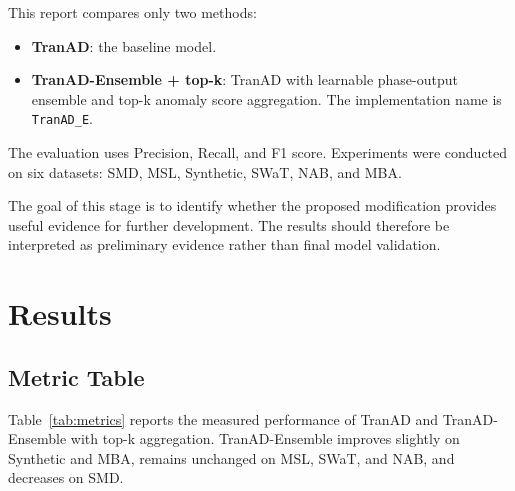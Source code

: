 \documentclass[a4paper,11pt]{article}
\begin{document}
This report compares only two methods:

\begin{itemize}
    \item \textbf{TranAD}: the baseline model.
    \item \textbf{TranAD-Ensemble + top-k}: TranAD with learnable phase-output ensemble and top-k anomaly score aggregation. The implementation name is \texttt{TranAD\_E}.
\end{itemize}

The evaluation uses Precision, Recall, and F1 score. Experiments were conducted on six datasets: SMD, MSL, Synthetic, SWaT, NAB, and MBA.

The goal of this stage is to identify whether the proposed modification provides useful evidence for further development. The results should therefore be interpreted as preliminary evidence rather than final model validation.

\section{Results}

\subsection{Metric Table}

Table~\ref{tab:metrics} reports the measured performance of TranAD and TranAD-Ensemble with top-k aggregation. TranAD-Ensemble improves slightly on Synthetic and MBA, remains unchanged on MSL, SWaT, and NAB, and decreases on SMD.
\end{document}
